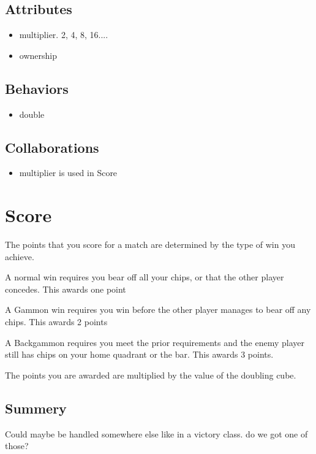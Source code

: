 \documentclass{report}
\begin{document}
\subsection{Attributes}
\begin{itemize}
\item multiplier. 2, 4, 8, 16....
\item ownership
\end{itemize}

\subsection{Behaviors}
\begin{itemize}
\item double
\end{itemize}

\subsection{Collaborations}
\begin{itemize}
\item multiplier is used in Score
\end{itemize}

\section{Score}
\begin{dashed}
\item The points that you score for a match are determined by the type of win you achieve.
\item A normal win requires you bear off all your chips, or that the other player concedes. This awards one point
\item A Gammon win requires you win before the other player manages to bear off any chips. This awards 2 points
\item A Backgammon requires you meet the prior requirements and the enemy player still has chips on your home quadrant or the bar. This awards 3 points.
\item The points you are awarded are multiplied by the value of the doubling cube.
\end{dashed}

\subsection{Summery}
Could maybe be handled somewhere else like in a victory class. do we got one of those?
\end{document}
